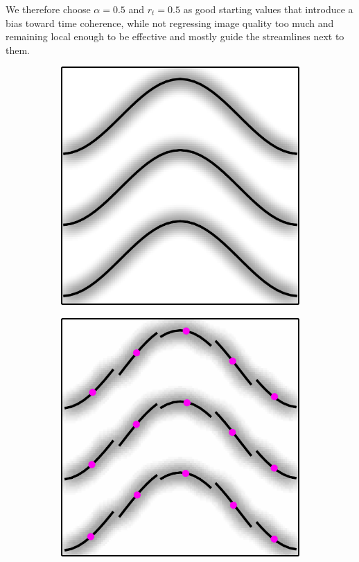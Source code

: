 We therefore choose $\alpha = 0.5$ and $r_t=0.5$ as good starting values that introduce
a bias toward time coherence, while not regressing image quality too much and remaining
local enough to be effective and mostly guide the streamlines next to them.

\newpage


\begin{figure}[ht!]
    \centering
    \begin{subfigure}[b]{.3\textwidth}
        \centering
        \includegraphics[scale=.08]{figures/Shatter/3Lines.png}
        \caption{}
    \end{subfigure}
    \begin{subfigure}[b]{.3\textwidth}
        \centering
        \includegraphics[scale=.08]{figures/Shatter/15Lines.png}

\end{subfigure}
\end{figure}
